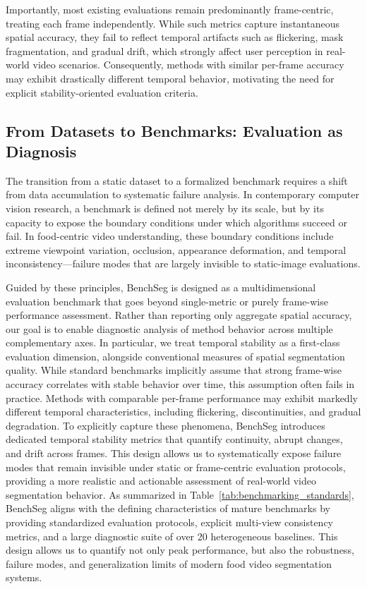 \documentclass[preprint,12pt]{elsarticle}
\begin{document}
Importantly, most existing evaluations remain predominantly frame-centric, treating each frame independently. While such metrics capture instantaneous spatial accuracy, they fail to reflect temporal artifacts such as flickering, mask fragmentation, and gradual drift, which strongly affect user perception in real-world video scenarios. Consequently, methods with similar per-frame accuracy may exhibit drastically different temporal behavior, motivating the need for explicit stability-oriented evaluation criteria.

\subsection{From Datasets to Benchmarks: Evaluation as Diagnosis}
\label{subsec:benchmark_philosophy}

The transition from a static dataset to a formalized benchmark requires a shift from data accumulation to systematic failure analysis. In contemporary computer vision research, a benchmark is defined not merely by its scale, but by its capacity to expose the boundary conditions under which algorithms succeed or fail. In food-centric video understanding, these boundary conditions include extreme viewpoint variation, occlusion, appearance deformation, and temporal inconsistency—failure modes that are largely invisible to static-image evaluations.

Guided by these principles, BenchSeg is designed as a multidimensional evaluation benchmark that goes beyond single-metric or purely frame-wise performance assessment. Rather than reporting only aggregate spatial accuracy, our goal is to enable diagnostic analysis of method behavior across multiple complementary axes. In particular, we treat temporal stability as a first-class evaluation dimension, alongside conventional measures of spatial segmentation quality. While standard benchmarks implicitly assume that strong frame-wise accuracy correlates with stable behavior over time, this assumption often fails in practice. Methods with comparable per-frame performance may exhibit markedly different temporal characteristics, including flickering, discontinuities, and gradual degradation. To explicitly capture these phenomena, BenchSeg introduces dedicated temporal stability metrics that quantify continuity, abrupt changes, and drift across frames. This design allows us to systematically expose failure modes that remain invisible under static or frame-centric evaluation protocols, providing a more realistic and actionable assessment of real-world video segmentation behavior. As summarized in Table~\ref{tab:benchmarking_standards}, BenchSeg aligns with the defining characteristics of mature benchmarks by providing standardized evaluation protocols, explicit multi-view consistency metrics, and a large diagnostic suite of over 20 heterogeneous baselines. This design allows us to quantify not only peak performance, but also the robustness, failure modes, and generalization limits of modern food video segmentation systems.
\end{document}
